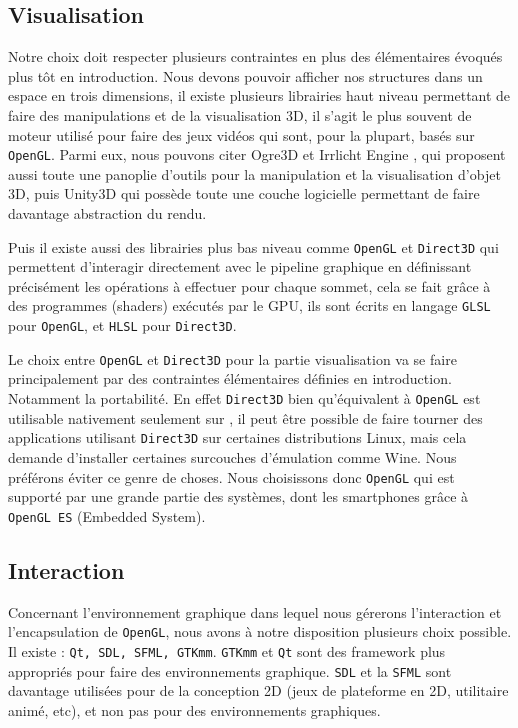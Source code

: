\documentclass[a4paper, 11pt]{article}
\begin{document}
\subsection{Visualisation}
Notre choix doit respecter plusieurs contraintes en plus des élémentaires évoqués plus tôt en introduction. Nous devons pouvoir afficher nos structures dans un espace en trois dimensions, il existe plusieurs librairies haut niveau permettant de faire des manipulations et de la visualisation 3D, il s'agit le plus souvent de moteur utilisé pour faire des jeux vidéos qui sont, pour la plupart, basés sur \texttt{OpenGL}. Parmi eux, nous pouvons citer Ogre3D \cite{OGRE3d} et Irrlicht Engine \cite{IRRLICHT}, qui proposent aussi toute une panoplie d'outils pour la manipulation et la visualisation d'objet 3D, puis Unity3D \cite{UNITY} qui possède toute une couche logicielle permettant de faire davantage abstraction du rendu.

Puis il existe aussi des librairies plus bas niveau comme \texttt{OpenGL} et \texttt{Direct3D} qui permettent d'interagir directement avec le pipeline graphique en définissant précisément les opérations à effectuer pour chaque sommet, cela se fait grâce à des programmes (shaders) exécutés par le GPU, ils sont écrits en langage \texttt{GLSL} pour \texttt{OpenGL}, et \texttt{HLSL} pour \texttt{Direct3D}.

Le choix entre \texttt{OpenGL} et \texttt{Direct3D} pour la partie visualisation va se faire principalement par des contraintes élémentaires définies en introduction. Notamment la portabilité. En effet \texttt{Direct3D} bien qu'équivalent à \texttt{OpenGL} est utilisable nativement seulement sur , il peut être possible de faire tourner des applications utilisant \texttt{Direct3D} sur certaines distributions Linux, mais cela demande d'installer certaines surcouches d'émulation comme Wine. Nous préférons éviter ce genre de choses. Nous choisissons donc \texttt{OpenGL} qui est supporté par une grande partie des systèmes, dont les smartphones grâce à \texttt{OpenGL ES} (Embedded System).

\subsection{Interaction}

Concernant l'environnement graphique dans lequel nous gérerons l'interaction et l'encapsulation de \texttt{OpenGL}, nous avons à notre disposition plusieurs choix possible. Il existe : \texttt{Qt, SDL, SFML, GTKmm}. \texttt{GTKmm} et \texttt{Qt} sont des framework plus appropriés pour faire des environnements graphique. \texttt{SDL} et la \texttt{SFML} sont davantage utilisées pour de la conception 2D (jeux de plateforme en 2D, utilitaire animé, etc), et non pas pour des environnements graphiques.
\end{document}
